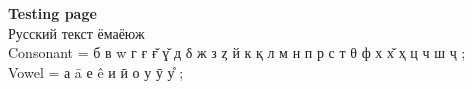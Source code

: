 {\bf Testing page}\\
Русский текст ёмаёюж\\
Consonant = б в w г ғ \v{ғ} \v{ɣ} д δ ж з ȥ й к қ л м н п р с т θ ф х \v{х} ҳ ц ч ш ҷ ;\\
Vowel =     а ā е ê и ӣ о у ӯ \r{у} ;